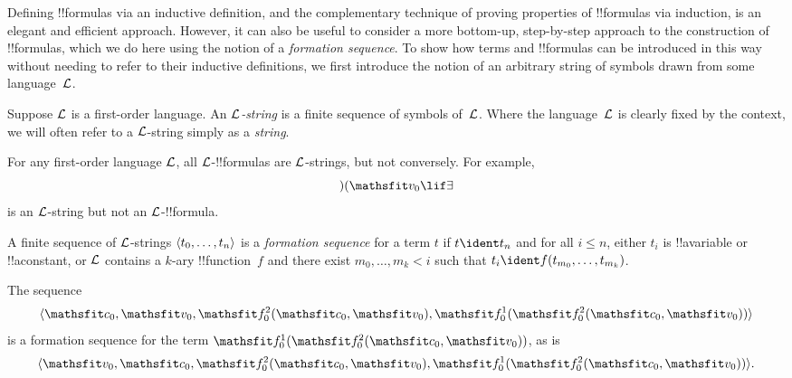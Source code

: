 \documentclass[../../../include/open-logic-section]{subfiles}
\begin{document}


Defining !!{formula}s via an inductive definition, and the
complementary technique of proving properties of !!{formula}s via
induction, is an elegant and efficient approach. However, it can
also be useful to consider a more bottom-up, step-by-step approach
to the construction of !!{formula}s, which we do here using the
notion of a \emph{formation sequence}.
%
To show how terms and !!{formula}s can be introduced in this way
without needing to refer to their inductive definitions, we first
introduce the notion of an arbitrary string of symbols drawn from
some language~$\Lang L$.

\begin{defn}[Strings]
Suppose $\Lang L$ is a first-order language. An \emph{$\Lang
L$-string} is a finite sequence of symbols of~$\Lang L$. Where the
language~$\Lang L$ is clearly fixed by the context, we will often
refer to a $\Lang L$-string simply as a \emph{string}.
\end{defn}

\begin{ex}
For any first-order language $\Lang L$, all
$\Lang L$-!!{formula}s are $\Lang L$-strings, but not
conversely. For example, \[)(\Obj v_0\lif\lexists\] is an
$\Lang L$-string but not an $\Lang L$-!!{formula}.
\end{ex}

\begin{defn}
A finite sequence of $\Lang L$-strings $\langle t_0,\dotsc,t_n \rangle$ is a
\emph{formation sequence} for a term $t$ if $t \ident t_n$ and for all
$i \leq n$, either $t_i$ is !!a{variable} or !!a{constant}, or $\Lang
L$ contains a $k$-ary !!{function}~$f$ and there exist
$m_0,\dotsc,m_k < i$ such that $t_i \ident f(t_{m_0},\dotsc,t_{m_k})$.
\end{defn}

\begin{ex}
The sequence
\[
    \tuple{\Obj c_0, \Obj v_0, \Atom{\Obj f^2_0}{\Obj c_0, \Obj v_0}, \Atom{\Obj f^1_0}{\Atom{\Obj f^2_0}{\Obj c_0, \Obj v_0}}}
\]
is a formation sequence for the term $\Atom{\Obj f^1_0}{\Atom{\Obj
f^2_0}{\Obj c_0, \Obj v_0}}$, as is
\[
    \tuple{\Obj v_0, \Obj c_0, \Atom{\Obj f^2_0}{\Obj c_0, \Obj v_0}, \Atom{\Obj f^1_0}{\Atom{\Obj f^2_0}{\Obj c_0, \Obj v_0}}}.
\]
\end{ex}
\end{document}
